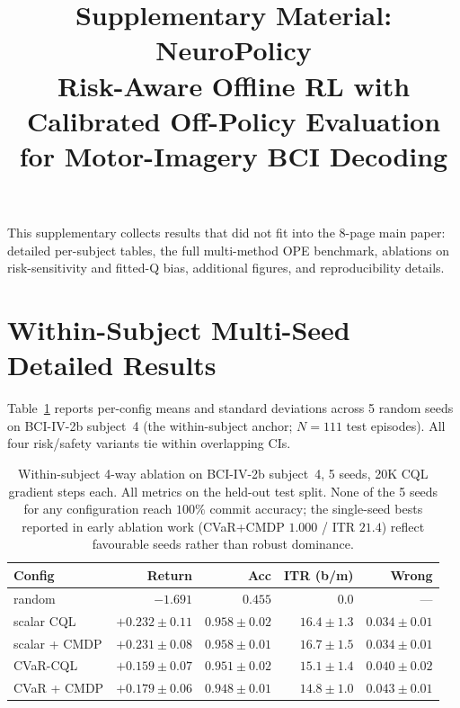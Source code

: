 \documentclass[conference]{IEEEtran}
\newcommand{\nettype}{NeuroPolicy}
\newcommand{\bcib}{BCI-IV-2b}
\newcommand{\cql}{CQL}
\begin{document}
\title{Supplementary Material: \nettype{}\\Risk-Aware Offline RL with Calibrated Off-Policy Evaluation\\for Motor-Imagery BCI Decoding}

\author{
}

\maketitle

This supplementary collects results that did not fit into the
8-page main paper: detailed per-subject tables, the full
multi-method OPE benchmark, ablations on risk-sensitivity and
fitted-Q bias, additional figures, and reproducibility details.

\tableofcontents

\section{Within-Subject Multi-Seed Detailed Results}

Table~\ref{tab:sup:multiseed} reports per-config means and standard
deviations across 5 random seeds on \bcib{} subject~4 (the
within-subject anchor; $N\!=\!111$ test episodes). All four
risk/safety variants tie within overlapping CIs.

\begin{table}[h]
\centering
\caption{Within-subject 4-way ablation on \bcib{} subject~4, 5
seeds, 20K \cql{} gradient steps each. All metrics on the held-out
test split. None of the 5 seeds for any configuration reach $100\%$
commit accuracy; the single-seed bests reported in early
ablation work (CVaR+CMDP $1.000$ / ITR $21.4$) reflect favourable
seeds rather than robust dominance.}
\label{tab:sup:multiseed}
\footnotesize
\begin{tabular}{l r r r r}
\toprule
Config & Return & Acc & ITR (b/m) & Wrong \\
\midrule
random           & $-1.691$ & $0.455$ & $0.0$ & --- \\
scalar \cql{}    & $+0.232 \!\pm\! 0.11$ & $0.958 \!\pm\! 0.02$ & $16.4 \!\pm\! 1.3$ & $0.034 \!\pm\! 0.01$ \\
scalar + CMDP    & $+0.231 \!\pm\! 0.08$ & $0.958 \!\pm\! 0.01$ & $16.7 \!\pm\! 1.5$ & $0.034 \!\pm\! 0.01$ \\
CVaR-\cql{}      & $+0.159 \!\pm\! 0.07$ & $0.951 \!\pm\! 0.02$ & $15.1 \!\pm\! 1.4$ & $0.040 \!\pm\! 0.02$ \\
CVaR + CMDP      & $+0.179 \!\pm\! 0.06$ & $0.948 \!\pm\! 0.01$ & $14.8 \!\pm\! 1.0$ & $0.043 \!\pm\! 0.01$ \\
\bottomrule
\end{tabular}
\end{table}
\end{document}
